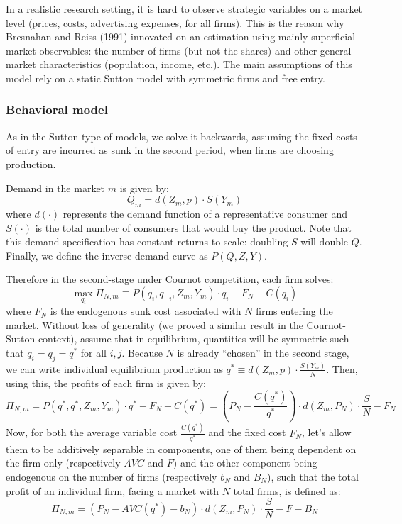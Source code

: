 In a realistic research setting, it is hard to observe strategic variables on a market level (prices, costs, advertising expenses, for all firms). This is the reason why Bresnahan and Reiss (1991) innovated on an estimation using mainly superficial market observables: the number of firms (but not the shares) and other general market characteristics (population, income, etc.). The main assumptions of this model rely on a static Sutton model with symmetric firms and free entry.

\subsubsection{Behavioral model}

As in the Sutton-type of models, we solve it backwards, assuming the fixed costs of entry are incurred as sunk in the second period, when firms are choosing production.

Demand in the market $m$ is given by: $$ Q_m = d(Z_m, p)\cdot S(Y_m) $$ where $d(\cdot)$ represents the demand function of a representative consumer and $S(\cdot)$ is the total number of consumers that would buy the product. Note that this demand specification has constant returns to scale: doubling $S$ will double $Q$. Finally, we define the inverse demand curve as $P(Q, Z, Y)$.

Therefore in the second-stage under Cournot competition, each firm solves: $$\max_{q_i}\Pi_{N,m} \equiv P(q_i, q_{-i}, Z_m, Y_m) \cdot q_i - F_N - C(q_i) $$ where $F_N$ is the endogenous sunk cost associated with $N$ firms entering the market. Without loss of generality (we proved a similar result in the Cournot-Sutton context), assume that in equilibrium, quantities will be symmetric such that $q_i = q_j = q^*$ for all $i,j$. Because $N$ is already ``chosen'' in the second stage, we can write individual equilibrium production as $q^* \equiv d(Z_m, p)\cdot \frac{S(Y_m)}{N}$. Then, using this, the profits of each firm is given by: $$\Pi_{N,m} = P(q^*, q^*, Z_m, Y_m) \cdot q^* - F_N - C(q^*) = \left(P_N - \frac{C(q^*)}{q^*} \right) \cdot d(Z_m, P_N)\cdot \frac{S}{N} - F_N $$ Now, for both the average variable cost $\frac{C(q^*)}{q^*}$ and the fixed cost $F_N$, let's allow them to be additively separable in components, one of them being dependent on the firm only (respectively $AVC$ and $F$) and the other component being endogenous on the number of firms (respectively $b_N$ and $B_N$), such that the total profit of an individual firm, facing a market with $N$ total firms, is defined as: $$\Pi_{N,m} = \left(P_N - AVC(q^*) - b_N \right) \cdot d(Z_m, P_N)\cdot \frac{S}{N} - F - B_N $$


